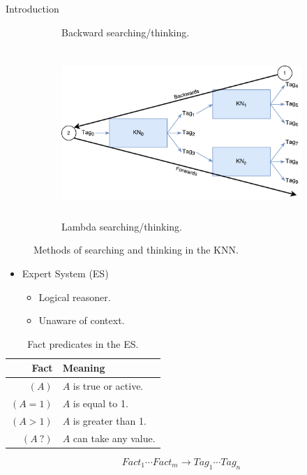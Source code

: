 \documentclass[final]{beamer} %
\begin{document}
\begin{frame}
\begin{columns}
\begin{column}{.3\textwidth}
{\begin{block}{Introduction}
\begin{figure}[!htb]
\begin{subfigure}[!htb]{0.49\columnwidth}
							\caption{Backward searching/thinking.}
							\label{think_backwards}
						\end{subfigure}
						\begin{subfigure}[!htb]{0.49\columnwidth}
							\centering
							\includegraphics[height=2.5in]{figures/lambda_thinking.pdf}
							\caption{Lambda searching/thinking.}
							\label{think_lambda}
						\end{subfigure}
						\caption{Methods of searching and thinking in the KNN.}
					\end{figure}
					
					\begin{itemize}
						\item Expert System (ES)
						\begin{itemize}
							\item Logical reasoner.
							\item Unaware of context.
						\end{itemize}
					\end{itemize}
					
					\begin{table}[!htb]
						\centering
						\caption{Fact predicates in the ES.}
						\begin{tabular}{r | l}
							\textbf{Fact} & \textbf{Meaning} \\ \hline
							$(A)$ & $A$ is true or active.\\
							$(A = 1)$ & $A$ is equal to 1. \\
							$(A > 1)$ & $A$ is greater than 1. \\
							$(A \ ?)$ & $A$ can take any value.
						\end{tabular}
						\label{table:fact_predicates}
					\end{table}
					
					\begin{equation} \label{eq:rule}
					Fact_1 \cdots Fact_m \rightarrow Tag_1 \cdots Tag_n
					\end{equation}
					

\end{block}}
\end{column}
\end{columns}
\end{frame}
\end{document}

